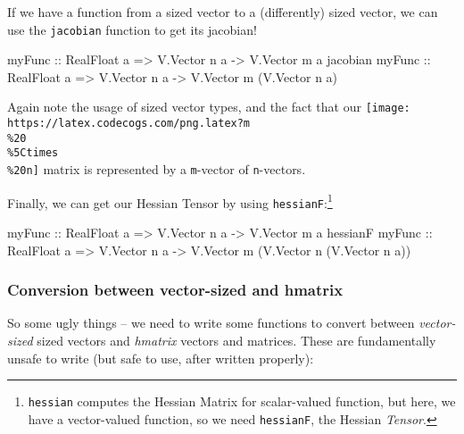 \documentclass[]{article}
\newenvironment{Shaded}{}{}
\newcommand{\DataTypeTok}[1]{\textcolor[rgb]{0.56,0.13,0.00}{#1}}
\newcommand{\OtherTok}[1]{\textcolor[rgb]{0.00,0.44,0.13}{#1}}
\newcommand{\NormalTok}[1]{#1}
\begin{document}
If we have a function from a sized vector to a (differently) sized vector, we
can use the \texttt{jacobian} function to get its jacobian!

\begin{Shaded}
\begin{Highlighting}[]
\OtherTok{myFunc          ::} \DataTypeTok{RealFloat}\NormalTok{ a }\OtherTok{=>} \DataTypeTok{V.Vector}\NormalTok{ n a }\OtherTok{->} \DataTypeTok{V.Vector}\NormalTok{ m a}
\NormalTok{jacobian}\OtherTok{ myFunc ::} \DataTypeTok{RealFloat}\NormalTok{ a }\OtherTok{=>} \DataTypeTok{V.Vector}\NormalTok{ n a }\OtherTok{->} \DataTypeTok{V.Vector}\NormalTok{ m (}\DataTypeTok{V.Vector}\NormalTok{ n a)}
\end{Highlighting}
\end{Shaded}

Again note the usage of sized vector types, and the fact that our
\texttt{[image: https://latex.codecogs.com/png.latex?m\\\%20\\\%5Ctimes\\\%20n]}
matrix is represented by a \texttt{m}-vector of \texttt{n}-vectors.

Finally, we can get our Hessian Tensor by using \texttt{hessianF}:\footnote{\texttt{hessian}
  computes the Hessian Matrix for scalar-valued function, but here, we have a
  vector-valued function, so we need \texttt{hessianF}, the Hessian
  \emph{Tensor}.}

\begin{Shaded}
\begin{Highlighting}[]
\NormalTok{myFunc}
\OtherTok{    ::} \DataTypeTok{RealFloat}\NormalTok{ a }\OtherTok{=>} \DataTypeTok{V.Vector}\NormalTok{ n a }\OtherTok{->} \DataTypeTok{V.Vector}\NormalTok{ m a}
\NormalTok{hessianF myFunc}
\OtherTok{    ::} \DataTypeTok{RealFloat}\NormalTok{ a }\OtherTok{=>} \DataTypeTok{V.Vector}\NormalTok{ n a }\OtherTok{->} \DataTypeTok{V.Vector}\NormalTok{ m (}\DataTypeTok{V.Vector}\NormalTok{ n (}\DataTypeTok{V.Vector}\NormalTok{ n a))}
\end{Highlighting}
\end{Shaded}

\subsubsection{Conversion between vector-sized and
hmatrix}\label{conversion-between-vector-sized-and-hmatrix}

So some ugly things -- we need to write some functions to convert between
\emph{vector-sized} sized vectors and \emph{hmatrix} vectors and matrices. These
are fundamentally unsafe to write (but safe to use, after written properly):
\end{document}
